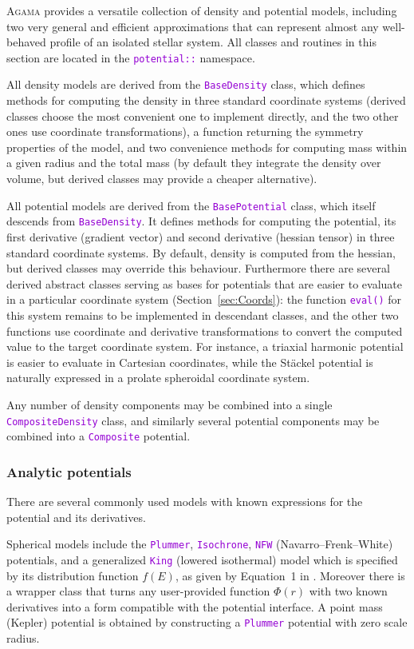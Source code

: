 \documentclass[12pt]{article}
\newcommand{\Agama}{\textsc{Agama}\xspace}
\newcommand{\ttt}[1]{\textcolor{darkviolet}{\texttt{#1}}}
\begin{document}
\Agama provides a versatile collection of density and potential models, including two very general and efficient approximations that can represent almost any well-behaved profile of an isolated stellar system. All classes and routines in this section are located in the \ttt{potential::} namespace.

All density models are derived from the \ttt{BaseDensity} class, which defines methods for computing the density in three standard coordinate systems (derived classes choose the most convenient one to implement directly, and the two other ones use coordinate transformations), a function returning the symmetry properties of the model, and two convenience methods for computing mass within a given radius and the total mass (by default they integrate the density over volume, but derived classes may provide a cheaper alternative).

All potential models are derived from the \ttt{BasePotential} class, which itself descends from \ttt{BaseDensity}. It defines methods for computing the potential, its first derivative (gradient vector) and second derivative (hessian tensor) in three standard coordinate systems. By default, density is computed from the hessian, but derived classes may override this behaviour.
Furthermore there are several derived abstract classes serving as bases for potentials that are easier to evaluate in a particular coordinate system (Section~\ref{sec:Coords}): the function \ttt{eval()} for this system remains to be implemented in descendant classes, and the other two functions use coordinate and derivative transformations to convert the computed value to the target coordinate system.
For instance, a triaxial harmonic potential is easier to evaluate in Cartesian coordinates, while the St\"ackel potential is naturally expressed in a prolate spheroidal coordinate system.

Any number of density components may be combined into a single \ttt{CompositeDensity} class, and similarly several potential components may be combined into a \ttt{Composite} potential.


\subsubsection{Analytic potentials}  \label{sec:PotentialAnalytic}

There are several commonly used models with known expressions for the potential and its derivatives. 

Spherical models include the \ttt{Plummer}, \ttt{Isochrone}, \ttt{NFW} (Navarro--Frenk--White) potentials, and a generalized \ttt{King} (lowered isothermal) model which is specified by its distribution function $f(E)$, as given by Equation~1 in \cite{GielesZocchi2015}.
Moreover there is a wrapper class that turns any user-provided function $\Phi(r)$ with two known derivatives into a form compatible with the potential interface. A point mass (Kepler) potential is obtained by constructing a \ttt{Plummer} potential with zero scale radius.
\end{document}
